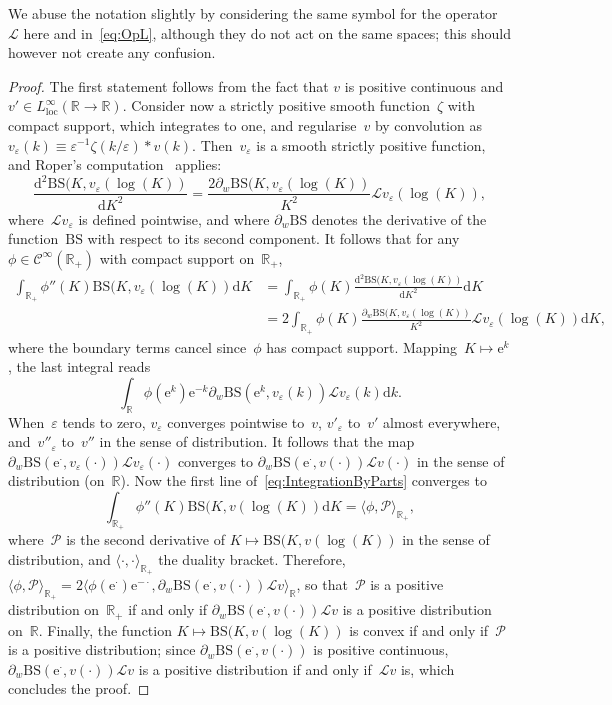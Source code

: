\documentclass{amsart}[11pt]
\numberwithin{equation}{section}
\theoremstyle{definition}
\newcommand{\D}{\mathrm{d}}
\newcommand{\RR}{\mathbb{R}}
\newcommand{\Ll}{\mathcal{L}}
\newcommand{\Pp}{\mathcal{P}}
\newcommand{\Cc}{\mathcal{C}}
\newcommand{\BS}{\mathrm{BS}}
\newcommand{\E}{\mathrm{e}}
\newcommand{\eps}{\varepsilon}
\newcommand{\loc}{\mathrm{loc}}
\begin{document}
We abuse the notation slightly by considering the same symbol for the operator~$\Ll$ 
here and in~\eqref{eq:OpL}, although they do not act on the same spaces;
this should however not create any confusion.

\begin{proof}
The first statement follows from the fact that $v$ is positive continuous and 
$v' \in L^\infty_{\loc}(\RR\to\RR)$.
Consider now a strictly positive smooth function~$\zeta$ with compact support, which integrates to one,
and regularise~$v$ by convolution as
$v_\eps(k) \equiv \eps^{-1}\zeta(k/\eps) \ast v(k)$.
Then~$v_\eps$ is a smooth strictly positive function, and Roper's computation~\cite[Theorem 2.9]{roper}
applies:
$$
\frac{\D^2 \BS(K, v_\eps(\log(K))}{\D K^2}
 = \frac{2\partial_w \BS(K, v_\eps(\log(K))}{K^2} \Ll v_\eps(\log(K)),
$$ 
where~$\Ll v_\eps$ is defined pointwise, 
and where $\partial_w \BS$ denotes the derivative of the function~$\BS$ 
with respect to its second component.
It follows that for any~$\phi \in \Cc^\infty(\RR_+)$ with compact support on~$\RR_+$,
\begin{align}\label{eq:IntegrationByParts}
\int_{\RR_+} \phi''(K) \BS(K, v_\eps(\log(K)) \D K
 & = \int_{\RR_+} \phi(K) \frac{\D^2 \BS(K, v_\eps(\log(K))}{\D K^2} \D K\\
 & =
2\int_{\RR_+}  \phi(K)\frac{\partial_w \BS(K, v_\eps(\log(K))}{K^2} \Ll v_\eps(\log(K))\D K,\nonumber
\end{align}
where the boundary terms cancel since~$\phi$ has compact support.
Mapping~$K\mapsto \E^{k}$, the last integral reads
$$
\int_{\RR} \phi(\E^k) \E^{-k} \partial_{w}\BS\left(\E^k, v_\eps(k)\right) \Ll v_\eps(k) \D k.
$$
When~$\eps$ tends to zero, 
$v_\eps$ converges pointwise to~$v$, 
$v'_\eps$ to~$v'$ almost everywhere, 
and~$v''_\eps$ to~$v''$ in the sense of distribution.
It follows that the map $\partial_{w}\BS\left(\E^\cdot, v_\eps(\cdot)\right) \Ll v_\eps(\cdot)$ 
converges to $\partial_{w}\BS\left(\E^\cdot, v(\cdot)\right) \Ll v(\cdot)$ 
in the sense of distribution (on~$\RR$). 
Now the first line of~\eqref{eq:IntegrationByParts} converges to 
$$
\int_{\RR_+} \phi''(K) \BS(K, v(\log(K))\D K = \langle\phi, \Pp\rangle_{\RR_{+}},
$$
where~$\Pp$ is the second derivative of $K \mapsto \BS(K, v(\log(K))$ in the sense of distribution,
and $\langle\cdot, \cdot\rangle_{\RR_+}$ the duality bracket.
Therefore,
$\langle \phi, \Pp\rangle_{\RR_+}
 = 2\langle \phi(\E^\cdot)\E^{-\cdot}, \partial_{w} \BS(\E^\cdot, v(\cdot)) \Ll v\rangle_{\RR}$,
so that~$\Pp$ is a positive distribution on~$\RR_{+}$ 
if and only if $\partial_{w}\BS(\E^\cdot, v(\cdot)) \Ll v$ is a positive distribution on~$\RR$.
Finally, the function $K \mapsto \BS(K, v(\log(K))$ is convex if and only if~$\Pp$ is a positive distribution;
since $\partial_{w}\BS(\E^{\cdot}, v(\cdot))$ is positive continuous, 
$\partial_{w}\BS(\E^\cdot, v(\cdot)) \Ll v$ is a positive distribution if and only if~$\Ll v$ is, 
which concludes the proof.

\end{proof}
\end{document}
